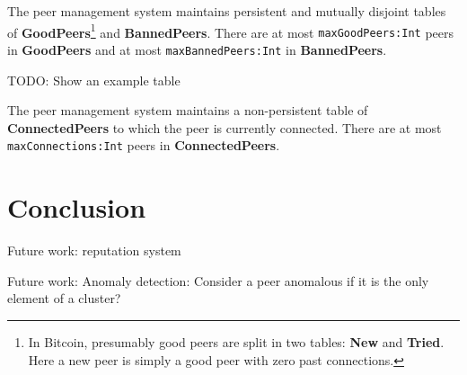 \documentclass[]{llncs}
\newcommand{\conf}[2]{{\color{dkgreen}\texttt{#1:#2}}}
\begin{document}
The peer management system maintains persistent and mutually disjoint
tables of \textbf{GoodPeers}\footnote{In Bitcoin, presumably good
peers are split in two tables: \textbf{New} and \textbf{Tried}. Here a
new peer is simply a good peer with zero past connections.} and
\textbf{BannedPeers}. There are at most \conf{maxGoodPeers}{Int} peers
in \textbf{GoodPeers} and at most \conf{maxBannedPeers}{Int} in
\textbf{BannedPeers}.

\begin{example}
TODO: Show an example table
\end{example}

The peer management system maintains a non-persistent table of
\textbf{ConnectedPeers} to which the peer is currently connected.
There are at most \conf{maxConnections}{Int} peers in
\textbf{ConnectedPeers}.

\section{Conclusion}


Future work: reputation system

Future work: Anomaly detection: Consider a peer anomalous if it is the only element of a
cluster?


 

\end{document}
